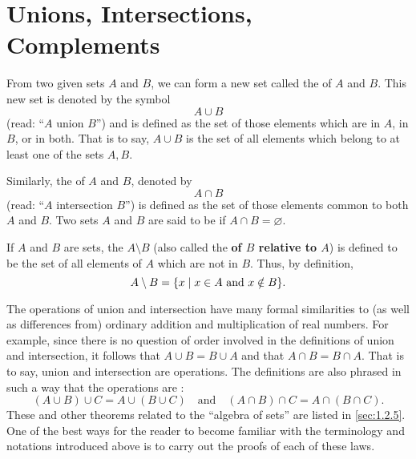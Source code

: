 \section{Unions, Intersections, Complements}\label{sec:1.2.4}

\begin{defn}\label{defn:1.2.7}
  From two given sets \(A\) and \(B\), we can form a new set called the \textbf{} of \(A\) and \(B\).
  This new set is denoted by the symbol
  \[
    A \cup B
  \]
  (read: ``\(A\) union \(B\)'')
  and is defined as the set of those elements which are in \(A\), in \(B\), or in both.
  That is to say, \(A \cup B\) is the set of all elements which belong to at least one of the sets \(A, B\).

  Similarly, the \textbf{} of \(A\) and \(B\), denoted by
  \[
    A \cap B
  \]
  (read: ``\(A\) intersection \(B\)'')
  is defined as the set of those elements common to both \(A\) and \(B\).
  Two sets \(A\) and \(B\) are said to be \textbf{} if \(A \cap B = \varnothing\).

  If \(A\) and \(B\) are sets, the \textbf{} \(A \setminus B\) (also called the \textbf{ of \(B\) relative to \(A\)}) is defined to be the set of all elements of \(A\) which are not in \(B\).
  Thus, by definition,
  \[
    A \setminus B = \set{x \mid x \in A \text{ and } x \notin B}.
  \]
\end{defn}

\begin{note}
  The operations of union and intersection have many formal similarities to (as well as differences from) ordinary addition and multiplication of real numbers.
  For example, since there is no question of order involved in the definitions of union and intersection, it follows that \(A \cup B = B \cup A\) and that \(A \cap B = B \cap A\).
  That is to say, union and intersection are \textbf{} operations.
  The definitions are also phrased in such a way that the operations are \textbf{}:
  \[
    (A \cup B) \cup C = A \cup (B \cup C) \quad \text{and} \quad (A \cap B) \cap C = A \cap (B \cap C).
  \]
  These and other theorems related to the ``algebra of sets'' are listed in \cref{sec:1.2.5}.
  One of the best ways for the reader to become familiar with the terminology and notations introduced above is to carry out the proofs of each of these laws.
\end{note}

